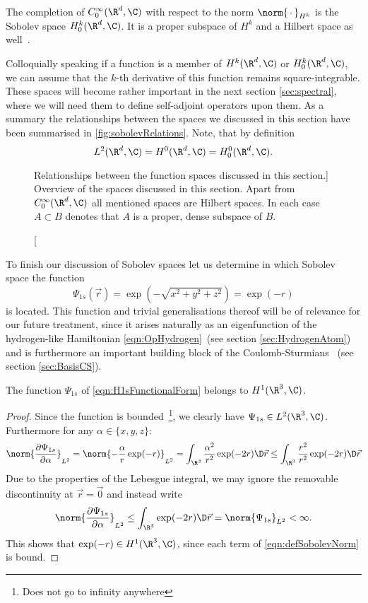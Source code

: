\begin{defn}
	The completion of $C^\infty_0(\R^d, \C)$
	with respect to the norm $\norm{\slot}_{H^k}$
	is the Sobolev space $H^k_0(\R^d, \C)$.
	It is a proper subspace of $H^k$ and a Hilbert space as well~\cite{Adams2003}.
\end{defn}
Colloquially speaking if a function is a member of $H^k(\R^d, \C)$ or $H^k_0(\R^d, \C)$,
we can assume that the $k$-th derivative of this function remains square-integrable.
These spaces will become rather important in the next section \vref{sec:spectral},
where we will need them to define self-adjoint operators upon them.
As a summary the relationships between the spaces we discussed
in this section have been summarised in \fig \vref{fig:sobolevRelations}.
Note, that by definition
\[ L^2(\R^d, \C) = H^0(\R^d, \C) = H^0_0(\R^d, \C). \]

\begin{figure}
	\centering
	\caption
		[Relationships between the function spaces discussed in this section.]
		{Overview of the spaces discussed in this section.
		Apart from $C^\infty_0(\R^d, \C)$ all mentioned spaces are Hilbert spaces.
		In each case $A \subset B$ denotes that $A$ is a proper, dense
		subspace of $B$.}
	\label{fig:sobolevRelations}
\end{figure}

To finish our discussion of Sobolev spaces let us determine
in which Sobolev space the function
\begin{equation}
	\label{eqn:H1sFunctionalForm}
	\Psi_{1s}(\vec{r}) = \exp\left(- \sqrt{x^2 + y^2 + z^2} \right) = \exp(-r)
\end{equation}
is located.
This function and trivial generalisations thereof
will be of relevance for our future treatment,
since it arises naturally as an eigenfunction of the hydrogen-like
Hamiltonian \eqref{eqn:OpHydrogen}~(see section \vref{sec:HydrogenAtom})
and is furthermore an important building block of the Coulomb-Sturmians%
~(see section \vref{sec:BasisCS}).

\begin{exmp}
	\label{exmp:H1sH1}
	The function $\Psi_{1s}$ of \eqref{eqn:H1sFunctionalForm} belongs to $H^1(\R^3, \C)$.
	\begin{proof}
	Since the function is bounded~\footnote{Does not go to infinity anywhere},
	we clearly have $\Psi_{1s} \in L^2(\R^3, \C)$.
	Furthermore for any $\alpha \in \{x, y, z\}$:
	\begin{equation}
		\norm{ \frac{\partial \Psi_{1s}}{\partial \alpha} }_{L^2}
		= \norm{ - \frac{\alpha}{r} \exp(-r) }_{L^2}
		= \int_{\R^3} \frac{\alpha^2}{r^2} \exp(-2r) \D\vec{r}
		\leq \int_{\R^3} \frac{r^2}{r^2} \exp(-2r) \D\vec{r}
		\label{eqn:ProofH1sH1}
	\end{equation}
	Due to the properties of the Lebesgue integral,
	we may ignore the removable discontinuity at $\vec{r} = \vec{0}$
	and instead write
	\[ \norm{ \frac{\partial \Psi_{1s}}{\partial \alpha} }_{L^2}
		\leq \int_{\R^3} \exp(-2r) \D\vec{r} = \norm{\Psi_{1s}}_{L^2} < \infty. \]
	This shows that $\exp(-r) \in H^1(\R^3, \C)$,
	since each term of \eqref{eqn:defSobolevNorm} is bound.
	\end{proof}
\end{exmp}

